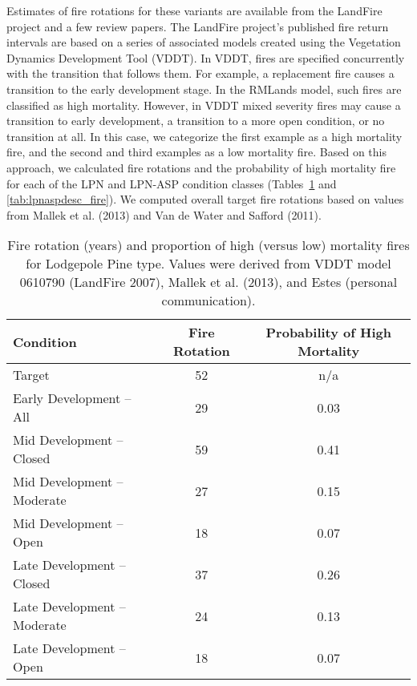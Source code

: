 Estimates of fire rotations for these variants are available from the LandFire project and a few review papers. The LandFire project’s published fire return intervals are based on a series of associated models created using the Vegetation Dynamics Development Tool (VDDT). In VDDT, fires are specified concurrently with the transition that follows them. For example, a replacement fire causes a transition to the early development stage. In the RMLands model, such fires are classified as high mortality. However, in VDDT mixed severity fires may cause a transition to early development, a transition to a more open condition, or no transition at all. In this case, we categorize the first example as a high mortality fire, and the second and third examples as a low mortality fire. Based on this approach, we calculated fire rotations and the probability of high mortality fire for each of the LPN and LPN-ASP condition classes (Tables~\ref{tab:lpndesc_fire} and \ref{tab:lpnaspdesc_fire}). We computed overall target fire rotations based on values from Mallek et al. (2013) and Van de Water and Safford (2011). 



\begin{table}[]
\centering
\caption{Fire rotation (years) and proportion of high (versus low) mortality fires for Lodgepole Pine type. Values were derived from VDDT model 0610790 (LandFire 2007), Mallek et al. (2013), and Estes (personal communication). }
\label{tab:lpndesc_fire}
\begin{tabular}{@{}lcc@{}}
\toprule
\textbf{Condition}          & \textbf{Fire Rotation} & \textbf{Probability of High Mortality} \\ \midrule
Target                      & 52    & n/a        \\
Early Development – All     & 29    & 0.03       \\
Mid Development – Closed    & 59    & 0.41       \\
Mid Development – Moderate  & 27    & 0.15       \\
Mid Development – Open      & 18    & 0.07       \\
Late Development – Closed   & 37    & 0.26       \\
Late Development – Moderate & 24    & 0.13       \\
Late Development – Open     & 18    & 0.07       \\ \bottomrule
\end{tabular}
\end{table}

